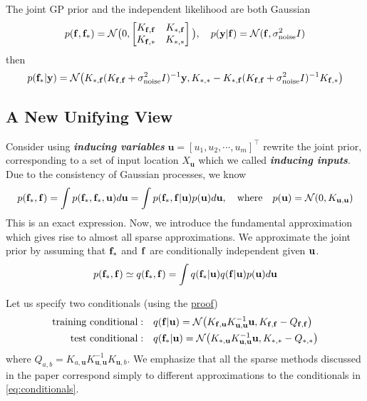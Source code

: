 \documentclass[10pt]{elegantbook}
\newcommand{\mydefination}[1]{\textbf{\textit{\textcolor{structurecolor}{#1}}}}
\begin{document}
The joint GP prior and the independent likelihood are both Gaussian
\begin{equation}
    p({\bf f},{\bf f}_{*}) = \mathcal N \big ( 0, 
    \begin{bmatrix}
        K_{{\bf f}, {\bf f}} & K_{{*}, {\bf f}} \\
        K_{{\bf f}, {*}} & K_{{*}, {*}}
    \end{bmatrix} \big ), \quad
    p({\bf y} | {\bf f}) = \mathcal N({\bf f}, \sigma_{\mathrm{noise}}^{2} I)
\end{equation}
then
\begin{equation}
    p({\bf f}_{*}|{\bf y})=
    \mathcal{N} \big (K_{{*}, {\bf f}} (K_{{\bf f}, {\bf f}} + \sigma_{\mathrm{noise}}^{2} I)^{-1}{\bf y},
    K_{{*}, {*}} - K_{{*}, {\bf f}}(K_{{\bf f}, {\bf f}} + \sigma_{\mathrm{noise}}^{2} I)^{-1} K_{{\bf f}, {*}} \big )
\end{equation}

\subsection{A New Unifying View}
Consider using \mydefination{inducing variables} $\mathbf u = [u_1, u_2, \cdots, u_m]^{\top}$ rewrite the joint prior, corresponding to a set of input 
location $X_{\mathbf u}$ which we called \mydefination{inducing inputs}. Due to the consistency of Gaussian processes, we know
\begin{equation}
    p({\bf f}_{*},{\bf f})=
    \int p({\bf f}_{*},{\bf f}_{*}, {\bf u}){d \mathbf u}=
    \int p({\bf f}_{*},{\bf f}|{\bf u})p({\bf u}){d \mathbf u},\quad\mathrm{where}\quad p({\bf u})={\mathcal N}(0,K_{\mathbf u,{\mathbf u}})
\end{equation}
This is an exact expression. Now, we introduce the fundamental approximation which gives rise
to almost all sparse approximations. We approximate the joint prior by assuming that ${\bf f}_{*}$ and $\bf f$ are
conditionally independent given $\bf u$.
\begin{equation}
    p({\bf f}_{*},{\bf f}) \simeq q({\bf f}_{*},{\bf f})=\int q({\bf f}_{*}|{\bf u})q({\bf f}|{\bf u})p({\bf u})d{\bf u}
\end{equation}

Let us specify two conditionals (using the \href{https://statproofbook.github.io/P/mvn-cond.html}{proof})
\begin{equation} \label{eq:conditionals}
\begin{aligned}
    \text{training conditional}: &\quad q({\bf f}|{\bf u}) = \mathcal N \big (K_{\mathbf f, \mathbf u} K_{\mathbf u, \mathbf u}^{-1} \mathbf u, 
    K_{\mathbf f, \mathbf f} - Q_{\mathbf f, \mathbf f} \big ) \\
    \text{test conditional}: &\quad q({\bf f}_*|{\bf u}) = \mathcal N \big (K_{*, \mathbf u} K_{\mathbf u, \mathbf u}^{-1} \mathbf u, 
    K_{*, *} - Q_{*, *} \big )
\end{aligned}
\end{equation}
where $Q_{a, b} = K_{a, \mathbf u} K_{\mathbf u, \mathbf u}^{-1} K_{\mathbf u, b}$.
We emphasize that all the sparse methods discussed in the paper correspond simply to different
approximations to the conditionals in \ref{eq:conditionals}.
\end{document}
